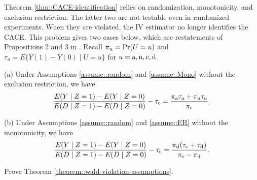 \begin{HomeworkProblem}\label{exr:22-7}

Theorem \ref{thm::CACE-identification} relies on randomization, monotonicity, and exclusion restriction. The latter two are not testable even in randomized experiments. When they are violated, the IV estimator no longer identifies the CACE. This problem gives two cases below, which are restatements of  Propositions 2 and 3 in \citet{angrist1996identification}. Recall $\pi_u = \operatorname{Pr}(U=u)$ and $\tau_u = E\{  Y(1) - Y(0) \mid U=u \}$ for $u=\textup{a}, \textup{n}, \textup{c}, \textup{d}$.


\begin{Theorem}
\label{theorem::wald-violation-assumptions}
(a)
Under Assumptions  \ref{assume::random} and \ref{assume::Mono} without the exclusion restriction, we have
\[
\frac{ E(Y\mid Z=1) - E(Y\mid Z=0) }{ E(D\mid Z=1) - E(D \mid Z=0) } - \tau_{\textup{c}}
= \frac{  \pi_{\textup{a}} \tau_{\textup{a}} + \pi_{\textup{n}} \tau_{\textup{n}}  }{  \pi_{\textup{c}} } .
\]


(b)
Under Assumptions  \ref{assume::random} and \ref{assume::ER} without the monotonicity, we have
\[
\frac{ E(Y\mid Z=1) - E(Y\mid Z=0) }{ E(D\mid Z=1) - E(D \mid Z=0) } - \tau_{\textup{c}}
= \frac{  \pi_{\textup{d}} (\tau_{\textup{c}} + \tau_{\textup{d}} )  }{   \pi_{\textup{c}} - \pi_{\textup{d}}   }.
\]
\end{Theorem}

Prove Theorem \ref{theorem::wald-violation-assumptions}.


\end{HomeworkProblem}

